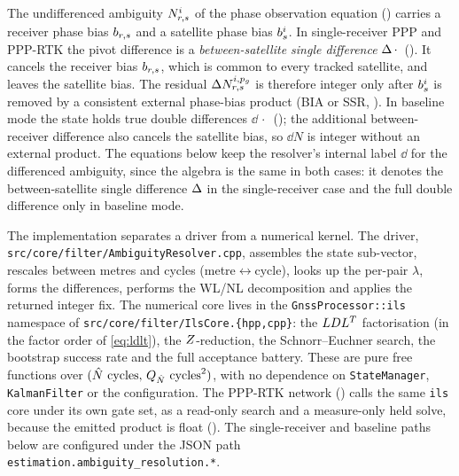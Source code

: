 \documentclass[main.tex]{subfiles}
\begin{document}
The undifferenced ambiguity $N^i_{r,s}$ of the phase
observation equation () carries a receiver phase bias $b_{r,s}$ and a
satellite phase bias $b^i_s$.  In single-receiver PPP and
PPP-RTK the pivot difference is a \emph{between-satellite single
difference} $\Delta \,\cdot\,$ ().  It cancels
the receiver bias $b_{r,s}$, which is common to every tracked
satellite, and leaves the satellite bias.  The residual
$\Delta N^{i,p_{g}}_{r,s}$ is therefore integer only after
$b^i_s$ is removed by a consistent external phase-bias product
(BIA or SSR, ).  In
baseline mode the state holds true double differences $\dd{\,\cdot\,}$
(); the additional between-receiver difference also cancels the
satellite bias, so $\dd N$ is integer without an external product.  The
equations below keep the resolver's internal label $\dd{}$ for the
differenced ambiguity, since the algebra is the same in both cases: it
denotes the between-satellite single difference $\Delta$ in the
single-receiver case and the full double difference only in baseline
mode.

The implementation separates a driver from a numerical kernel.  The
driver, \texttt{src/core/filter/AmbiguityResolver.cpp}, assembles the
state sub-vector, rescales between metres and cycles
(metre$\leftrightarrow$cycle), looks up the per-pair $\lambda$, forms the
differences, performs the WL/NL decomposition and applies the returned
integer fix.  The numerical core lives in the
\texttt{GnssProcessor::ils} namespace of
\texttt{src/core/filter/IlsCore.\{hpp,cpp\}}: the $LDL^{T}$
factorisation (in the factor order of \eqref{eq:ldlt}), the
$Z$-reduction, the Schnorr--Euchner search, the bootstrap success
rate and the full acceptance battery.  These are pure free functions over
$(\ambfloat\ \text{cycles},\,\ambcov\ \text{cycles}^2)$, with no
dependence on \texttt{StateManager}, \texttt{KalmanFilter} or the
configuration.  The PPP-RTK network () calls the same \texttt{ils} core under its own gate set, as a
read-only search and a measure-only held solve, because the emitted
product is float ().  The single-receiver and baseline
paths below are configured under the JSON path
\texttt{estimation.ambiguity\_resolution.*}.
\end{document}
